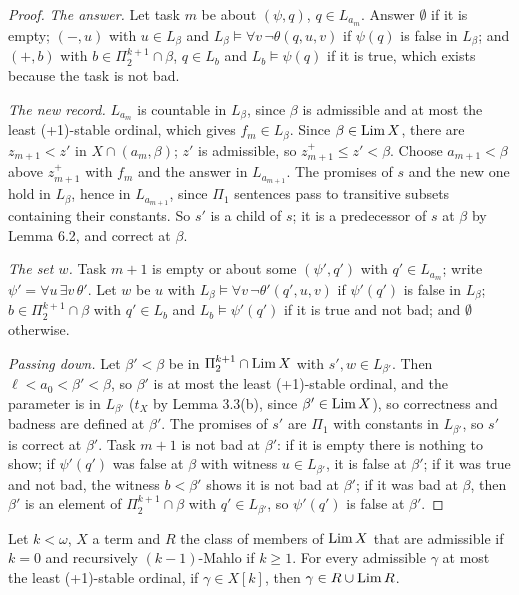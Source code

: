 \documentclass[11pt]{article}
\begin{document}
\begin{proof}
\emph{The answer.} Let task $m$ be about $(\psi, q)$, $q \in L_{a_m}$. Answer $\emptyset$ if it is empty; $(-, u)$ with
$u \in L_\beta$ and $L_\beta \models \forall v\, \neg\theta(q, u, v)$ if $\psi(q)$ is false in $L_\beta$; and $(+, b)$
with $b \in \Pi_2^{k+1} \cap \beta$, $q \in L_b$ and $L_b \models \psi(q)$ if it is true, which exists because the task is
not bad.

\emph{The new record.} $L_{a_m}$ is countable in $L_\beta$, since $\beta$ is admissible and at most the least (+1)-stable ordinal, which
gives
$f_m \in L_\beta$. Since $\beta \in \mathrm{Lim}\, X$, there are $z_{m+1} < z'$ in $X \cap (a_m, \beta)$; $z'$ is admissible, so
$z_{m+1}^+ \le z' < \beta$. Choose $a_{m+1} < \beta$ above $z_{m+1}^+$ with $f_m$ and the answer in $L_{a_{m+1}}$. The
promises of $s$ and the new one hold in $L_\beta$, hence in $L_{a_{m+1}}$, since $\Pi_1$ sentences pass to transitive
subsets containing their constants. So $s'$ is a child of $s$; it is a predecessor of $s$ at $\beta$ by Lemma 6.2, and
correct at $\beta$.

\emph{The set $w$.} Task $m+1$ is empty or about some $(\psi', q')$ with $q' \in L_{a_m}$; write $\psi' = \forall u\,
\exists v\, \theta'$. Let $w$ be $u$ with $L_\beta \models \forall v\, \neg\theta'(q', u, v)$ if $\psi'(q')$ is false in
$L_\beta$; $b \in \Pi_2^{k+1} \cap \beta$ with $q' \in L_b$ and $L_b \models \psi'(q')$ if it is true and not bad; and
$\emptyset$ otherwise.

\emph{Passing down.} Let $\beta' < \beta$ be in $\Pi_2^{k+1} \cap \mathrm{Lim}\, X$ with $s', w \in L_{\beta'}$. Then $\ell < a_0 <
\beta' < \beta$, so $\beta'$ is at most the least (+1)-stable ordinal, and the parameter is in $L_{\beta'}$ ($t_X$ by Lemma 3.3(b), since $\beta' \in \mathrm{Lim}\, X$), so
correctness and badness are defined at $\beta'$. The promises of $s'$ are $\Pi_1$ with constants in $L_{\beta'}$, so
$s'$ is correct at $\beta'$. Task $m+1$ is not bad at $\beta'$: if it is empty there is nothing to show; if $\psi'(q')$
was false at $\beta$ with witness $u \in L_{\beta'}$, it is false at $\beta'$; if it was true and not bad, the witness $b
< \beta'$ shows it is not bad at $\beta'$; if it was bad at $\beta$, then $\beta'$ is an element of $\Pi_2^{k+1} \cap
\beta$ with $q' \in L_{\beta'}$, so $\psi'(q')$ is false at $\beta'$.
\end{proof}

\begin{statement} Let $k < \omega$, $X$ a term and $R$ the class of members of
$\mathrm{Lim}\, X$ that are admissible if $k = 0$ and recursively $(k-1)$-Mahlo if $k \ge 1$. For
every admissible $\gamma$ at most the least (+1)-stable ordinal, if $\gamma \in X[k]$, then $\gamma \in R \cup \mathrm{Lim}\, R$.
\end{statement}
\end{document}
